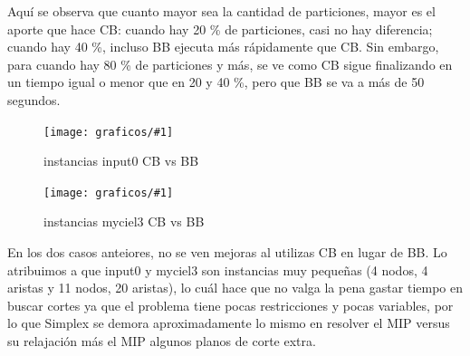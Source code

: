 \documentclass[a4paper, 10pt, twoside]{article}
\newcommand{\diagramavfigChico}[2]{%
  \begin{figure}[H]
    \texttt{[image: graficos/\#1]}%
    \caption{#2}
    \label{fig:#1}
  \end{figure}
}
\begin{document}
Aquí se observa que cuanto mayor sea la cantidad de particiones, mayor es el aporte que hace CB: cuando hay 20 \% de particiones, casi no hay diferencia; cuando hay 40 \%, incluso BB ejecuta más rápidamente que CB. Sin embargo, para cuando hay 80 \% de particiones y más, se ve como CB sigue finalizando en un tiempo igual o menor que en 20 y 40 \%, pero que BB se va a más de 50 segundos.

  \begin{minipage}{\linewidth}
      \centering
      \begin{minipage}{0.49\linewidth}
	      \diagramavfigChico{input0_comparandoRandomsYAlgoritmos}{instancias input0 CB vs BB}
      \end{minipage}
      \begin{minipage}{0.49\linewidth}
          \diagramavfigChico{myciel3_comparandoRandomsYAlgoritmos}{instancias myciel3 CB vs BB}
      \end{minipage}
  \end{minipage}
  
En los dos casos anteiores, no se ven mejoras al utilizas CB en lugar de BB. Lo atribuimos a que input0 y myciel3 son instancias muy pequeñas (4 nodos, 4 aristas y 11 nodos, 20 aristas), lo cuál hace que no valga la pena gastar tiempo en buscar cortes ya que el problema tiene pocas restricciones y pocas variables, por lo que Simplex se demora aproximadamente lo mismo en resolver el MIP versus su relajación más el MIP algunos planos de corte extra. 




	





\end{document}
